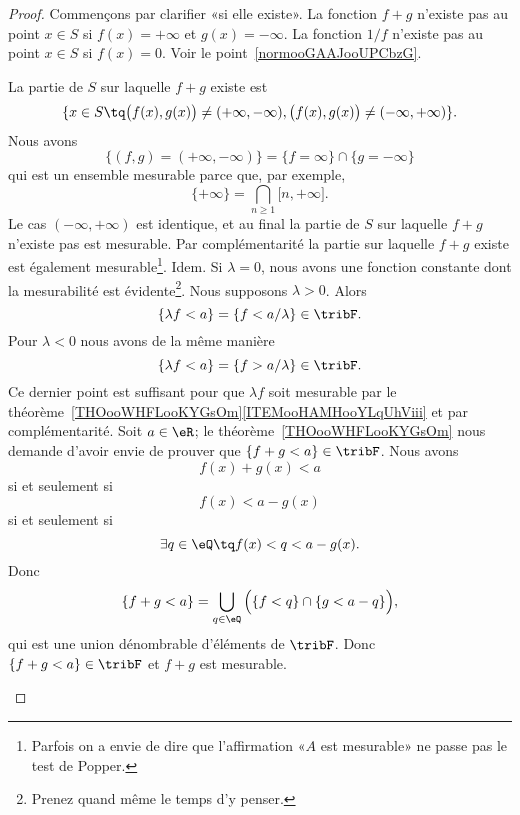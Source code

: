 \begin{proof}
	Commençons par clarifier «si elle existe». La fonction \( f+g\) n'existe pas au point \( x\in S\) si \( f(x)=+\infty\) et \( g(x)=-\infty\). La fonction \( 1/f\) n'existe pas au point \( x\in S\) si \( f(x)=0\). Voir le point~\ref{normooGAAJooUPCbzG}.
	\begin{subproof}
		La partie de \( S\) sur laquelle \( f+g\) existe est
		\begin{equation}
			\{ x\in S\tq \big( f(x),g(x) \big)\neq (+\infty,-\infty),\big( f(x),g(x) \big)\neq (-\infty,+\infty) \}.
		\end{equation}
		Nous avons
		\begin{equation}
			\{  (f,g)=(+\infty,-\infty) \}=\{ f=\infty \}\cap\{ g=-\infty \}
		\end{equation}
		qui est un ensemble mesurable parce que, par exemple,
		\begin{equation}
			\{ +\infty \}=\bigcap_{n\geq 1}\mathopen[ n , +\infty \mathclose].
		\end{equation}
		Le cas \( (-\infty,+\infty)\) est identique, et au final la partie de \( S\) sur laquelle \( f+g\) n'existe pas est mesurable. Par complémentarité la partie sur laquelle \( f+g\) existe est également mesurable\footnote{Parfois on a envie de dire que l'affirmation «\( A\) est mesurable» ne passe pas le test de Popper.}.
		Idem.
		Si \( \lambda=0\), nous avons une fonction constante dont la mesurabilité est évidente\footnote{Prenez quand même le temps d'y penser.}. Nous supposons \( \lambda>0\). Alors
		\begin{equation}
			\{ \lambda f<a \}=\{ f<a/\lambda \}\in \tribF.
		\end{equation}
		Pour \( \lambda<0\) nous avons de la même manière
		\begin{equation}
			\{ \lambda f<a \}=\{ f>a/\lambda \}\in \tribF.
		\end{equation}
		Ce dernier point est suffisant pour que \( \lambda f\) soit mesurable par le théorème~\ref{THOooWHFLooKYGsOm}\ref{ITEMooHAMHooYLqUhViii} et par complémentarité.
		\spitem[Mesurabilité de \( f+g\)]
		Soit \( a\in \eR\); le théorème~\ref{THOooWHFLooKYGsOm} nous demande d'avoir envie de prouver que \(  \{ f+g <a\} \in \tribF \). Nous avons
		\begin{equation}
			f(x)+g(x)<a
		\end{equation}
		si et seulement si
		\begin{equation}
			f(x)<a-g(x)
		\end{equation}
		si et seulement si
		\begin{equation}
			\exists q\in \eQ\tq f(x)<q<a-g(x).
		\end{equation}
		Donc
		\begin{equation}
			\{ f+g<a \}=\bigcup_{q\in \eQ}\Big( \{ f<q \}\cap\{ g<a-q \} \Big),
		\end{equation}
		qui est une union dénombrable d'éléments de \( \tribF\). Donc \( \{ f+g<a \}\in \tribF\) et \( f+g\) est mesurable.


\end{subproof}
\end{proof}
